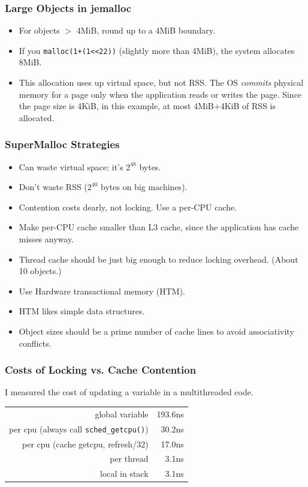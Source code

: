 \documentclass[xcolor=dvipsnames,14pt]{beamer}
\begin{document}
\begin{frame}
\frametitle{Large Objects in jemalloc}
\begin{itemize}
\item For objects $>$ 4MiB, round up to a 4MiB boundary.
\item If you \texttt{malloc(1+(1<<22))} (slightly more than 4MiB), the system allocates 8MiB.  
\item This allocation uses up virtual space, but not RSS\:.
  The OS \textit{commits} physical memory for a
  page only when the application reads or writes the page.  Since the page
  size is 4KiB, in this example, at most 4MiB+4KiB of RSS is allocated.
\end{itemize}
\end{frame}
\begin{frame}
\frametitle{SuperMalloc Strategies}

\begin{itemize}
\item Can waste virtual space: it's $2^{48}$ bytes.
\item Don't waste RSS ($2^{40}$ bytes on big machines).
\item Contention costs dearly, not locking.  Use a per-CPU cache.
\item Make per-CPU cache smaller than L3 cache, since the application
  has cache misses anyway.
\item Thread cache should be just big enough to reduce locking overhead.  (About 10 objects.)
\item Use Hardware transactional memory (HTM).
\item HTM likes simple data structures.
\item Object sizes should be a prime number of cache lines to avoid associativity conflicts.
\end{itemize}
\end{frame}



\begin{frame}
\frametitle{Costs of Locking vs. Cache Contention}

I measured the cost of updating a variable in a multithreaded code.

\begin{tabular}{rr}
                                                  global variable &    193.6ns \\
            per cpu (always call \texttt{sched_getcpu()})  &     30.2ns \\
per cpu (cache getcpu, refresh/32) &     17.0ns \\
                                                      per thread &      3.1ns \\
                                                  local in stack &      3.1ns \\
\end{tabular}
\end{frame}
\end{document}

